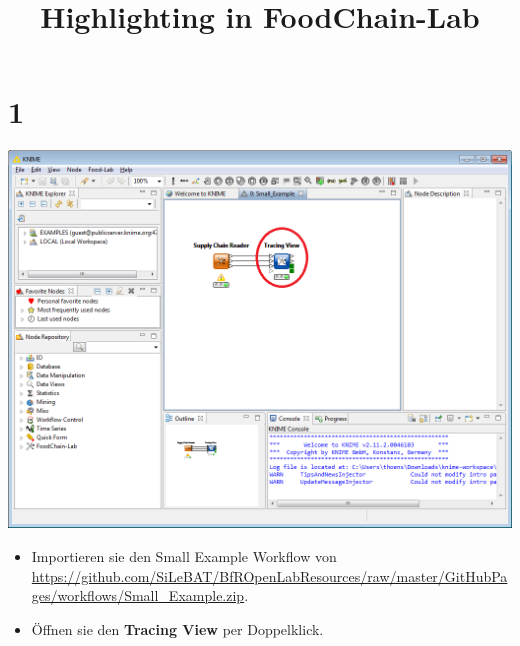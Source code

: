 \documentclass{beamer}
\title{Highlighting in FoodChain-Lab}
\date{}
\begin{document}
\maketitle
 
\section{1}
\begin{frame}
	\begin{center}
  		\includegraphics[height=0.6\textheight]{1.png}
	\end{center}
	\begin{itemize}
		\item Importieren sie den Small Example Workflow von \url{https://github.com/SiLeBAT/BfROpenLabResources/raw/master/GitHubPages/workflows/Small_Example.zip}.
		\item Öffnen sie den \textbf{Tracing View} per Doppelklick.
	\end{itemize}
\end{frame}
\end{document}

